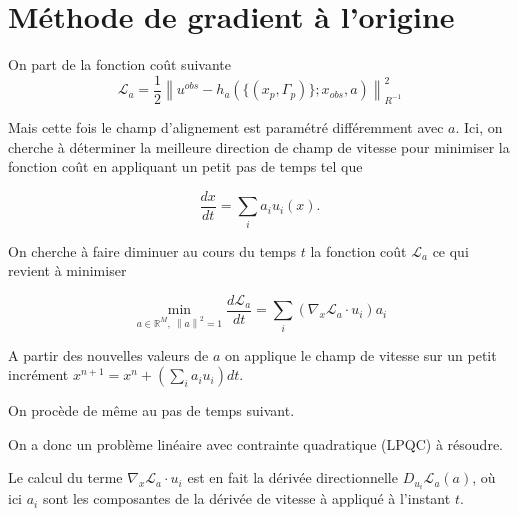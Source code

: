 \documentclass{article}
\newcommand{\norm}[1]{\left\lVert #1 \right\rVert}
\begin{document}
\section{Méthode de gradient à l'origine}

On part de la fonction coût suivante
\begin{equation*}
    \mathcal L_a =  \frac12 \norm{u^{obs} - h_a(\{(x_p, \Gamma_p)\}; x_{obs}, a)}^2_{R^{-1}}
\end{equation*}

Mais cette fois le champ d'alignement est paramétré différemment avec $a$.
Ici, on cherche à déterminer la meilleure direction de champ de vitesse pour minimiser la fonction coût en appliquant un petit pas de temps tel que

\begin{equation*}
    \frac{dx}{dt} = \sum_i a_i u_i(x).
\end{equation*}

On cherche à faire diminuer au cours du temps $t$ la fonction coût $\mathcal L_a$ ce qui revient à minimiser

\begin{equation*}
    \min_{a \in \mathbb{R}^M,~\norm{a}^2 = 1} \frac{d \mathcal L_a}{dt} = \sum_i (\nabla_x \mathcal L_a \cdot u_i ) a_i
\end{equation*}

A partir des nouvelles valeurs de $a$ on applique le champ de vitesse sur un petit incrément $x^{n+1} = x^n + \left(\sum_i a_i u_i\right) dt$.

On procède de même au pas de temps suivant.

On a donc un problème linéaire avec contrainte quadratique (LPQC) à résoudre.

Le calcul du terme $\nabla_x \mathcal L_a \cdot u_i$ est en fait la dérivée directionnelle $D_{u_i} \mathcal L_a(a)$, où ici $a_i$ sont les composantes de la dérivée de vitesse à appliqué à l'instant $t$.















\end{document}
